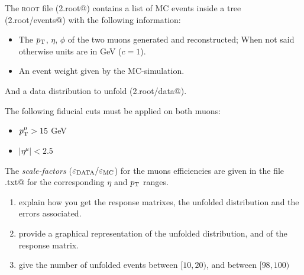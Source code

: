 \documentclass[a4paper,11pt]{article}
\begin{document}
The {\scshape root} file (\verb@Exe2.root@) contains a list of \gls{MC} events inside a tree (\verb@Exe2.root/events@) with the following information:
\begin{itemize}
	\item The $p_\textup{T}$, $\eta$, $\phi$ of the two muons generated and reconstructed; 
	      When not said otherwise units are in GeV ($c=1$).
	\item An event weight given by the \gls{MC}-simulation. 
\end{itemize}
And a data distribution to unfold (\verb@Exe2.root/data@). 

The following fiducial cuts must be applied on both muons:
\begin{itemize}
	\item $p_\textup{T}^\mu >15 $ GeV 
	\item $|\eta^\mu| < 2.5 $
\end{itemize}

The \emph{scale-factors} ($\varepsilon_\textup{DATA} / \varepsilon_\textup{MC}$) for the muons efficiencies are given in the file 
\verb@scalefactors.txt@ for the corresponding $\eta$ and $p_\textup{T}$ ranges.


\begin{enumerate}
	\item explain how you get the response matrixes, the unfolded distribution and the errors associated.
	\item provide a graphical representation of the unfolded distribution, and of the response matrix.
	\item give the number of unfolded events between $[10,20)$, and between $[98,100)$
\end{enumerate}

\FloatBarrier
\nocite{*}
%


\cleardoublepage
\end{document}
